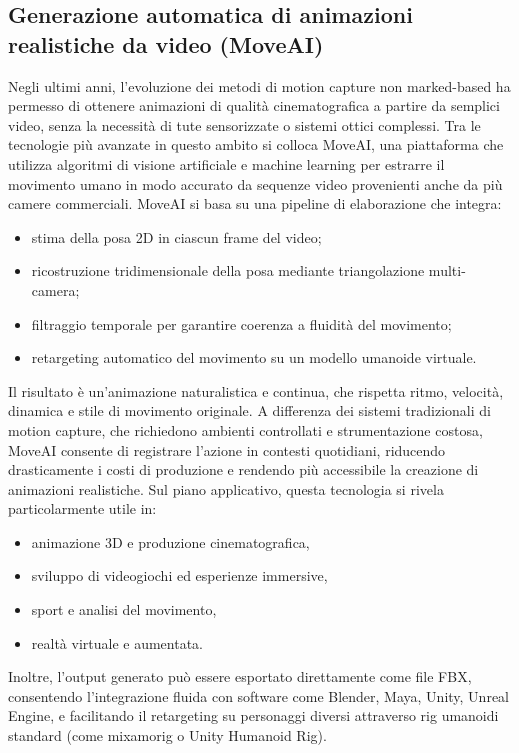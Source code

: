 \subsection{Generazione automatica di animazioni realistiche da video (MoveAI)}
Negli ultimi anni, l'evoluzione dei metodi di motion capture non marked-based ha permesso di ottenere animazioni di qualità cinematografica a partire da semplici video, senza la necessità di tute sensorizzate o sistemi ottici complessi. Tra le tecnologie più avanzate in questo ambito si colloca MoveAI, una piattaforma che utilizza algoritmi di visione artificiale e machine learning per estrarre il movimento umano in modo accurato da sequenze video provenienti anche da più camere commerciali.
MoveAI si basa su una pipeline di elaborazione che integra:
\begin{itemize}
    \item stima della posa 2D in ciascun frame del video;
    \item ricostruzione tridimensionale della posa mediante triangolazione multi-camera;
    \item filtraggio temporale per garantire coerenza a fluidità del movimento;
    \item retargeting automatico del movimento su un modello umanoide virtuale.
\end{itemize}
Il risultato è un'animazione naturalistica e continua, che rispetta ritmo, velocità, dinamica e stile di movimento originale. A differenza dei sistemi tradizionali di motion capture, che richiedono ambienti controllati e strumentazione costosa, MoveAI consente di registrare l'azione in contesti quotidiani, riducendo drasticamente i costi di produzione e rendendo più accessibile la creazione di animazioni realistiche.
Sul piano applicativo, questa tecnologia si rivela particolarmente utile in:
\begin{itemize}
    \item animazione 3D e produzione cinematografica,
    \item sviluppo di videogiochi ed esperienze immersive,
    \item sport e analisi del movimento,
    \item realtà virtuale e aumentata.
\end{itemize}
Inoltre, l'output generato può essere esportato direttamente come file FBX, consentendo l'integrazione fluida con software come Blender, Maya, Unity, Unreal Engine, e facilitando il retargeting su personaggi diversi attraverso rig umanoidi standard (come mixamorig o Unity Humanoid Rig).

